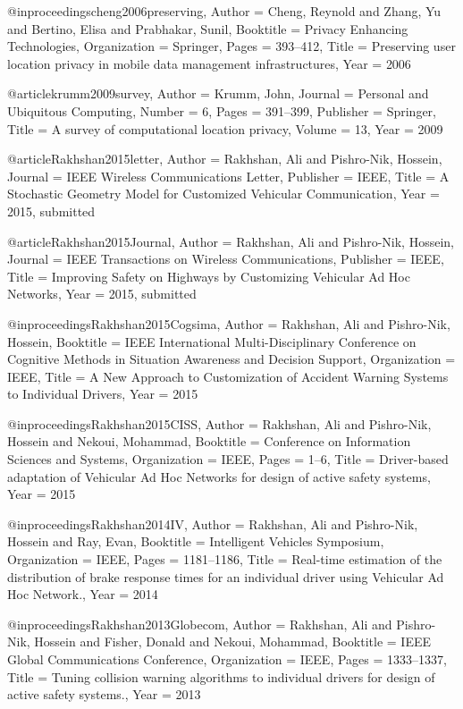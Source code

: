 {{@inproceedings{cheng2006preserving,
	Author = {Cheng, Reynold and Zhang, Yu and Bertino, Elisa and Prabhakar, Sunil},
	Booktitle = {Privacy Enhancing Technologies},
	Organization = {Springer},
	Pages = {393--412},
	Title = {Preserving user location privacy in mobile data management infrastructures},
	Year = {2006}}




@article{krumm2009survey,
	Author = {Krumm, John},
	Journal = {Personal and Ubiquitous Computing},
	Number = {6},
	Pages = {391--399},
	Publisher = {Springer},
	Title = {A survey of computational location privacy},
	Volume = {13},
	Year = {2009}}

@article{Rakhshan2015letter,
	Author = {Rakhshan, Ali and Pishro-Nik, Hossein},
	Journal = {IEEE Wireless Communications Letter},
	Publisher = {IEEE},
	Title = {A Stochastic Geometry Model for Customized Vehicular Communication},
	Year = {2015, submitted}}

@article{Rakhshan2015Journal,
	Author = {Rakhshan, Ali and Pishro-Nik, Hossein},
	Journal = {IEEE Transactions on Wireless Communications},
	Publisher = {IEEE},
	Title = {Improving Safety on Highways by Customizing Vehicular Ad Hoc Networks},
	Year = {2015, submitted}}

@inproceedings{Rakhshan2015Cogsima,
	Author = {Rakhshan, Ali and Pishro-Nik, Hossein},
	Booktitle = {IEEE International Multi-Disciplinary Conference on Cognitive Methods in Situation Awareness and Decision Support},
	Organization = {IEEE},
	Title = {A New Approach to Customization of Accident Warning Systems to Individual Drivers},
	Year = {2015}}

@inproceedings{Rakhshan2015CISS,
	Author = {Rakhshan, Ali and Pishro-Nik, Hossein and Nekoui, Mohammad},
	Booktitle = {Conference on Information Sciences and Systems},
	Organization = {IEEE},
	Pages = {1--6},
	Title = {Driver-based adaptation of Vehicular Ad Hoc Networks for design of active safety systems},
	Year = {2015}}

@inproceedings{Rakhshan2014IV,
	Author = {Rakhshan, Ali and Pishro-Nik, Hossein and Ray, Evan},
	Booktitle = {Intelligent Vehicles Symposium},
	Organization = {IEEE},
	Pages = {1181--1186},
	Title = {Real-time estimation of the distribution of brake response times for an individual driver using Vehicular Ad Hoc Network.},
	Year = {2014}}

@inproceedings{Rakhshan2013Globecom,
	Author = {Rakhshan, Ali and Pishro-Nik, Hossein and Fisher, Donald and Nekoui, Mohammad},
	Booktitle = {IEEE Global Communications Conference},
	Organization = {IEEE},
	Pages = {1333--1337},
	Title = {Tuning collision warning algorithms to individual drivers for design of active safety systems.},
	Year = {2013}}

}}
